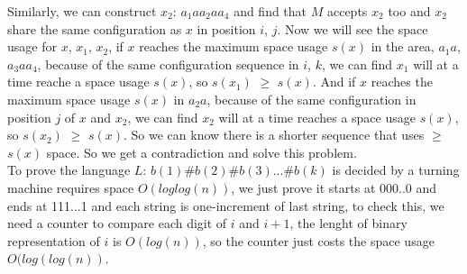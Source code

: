\documentclass[11pt]{article}
\begin{document}
Similarly, we can construct $x_{2}$: $a_{1}aa_{2}aa_{4}$ and find that $M$ accepts $x_{2}$ too and $x_{2}$ share the same configuration as $x$ in position $i$, $j$. Now we will see the space usage for $x$, $x_{1}$, $x_{2}$, if $x$ reaches the maximum space usage $s(x)$ in the area, $a_{1}a$, $a_{3}aa_{4}$, 
because of the same configuration sequence in $i$, $k$, we can find $x_{1}$ will at a time reache a space usage $s(x)$, so $s(x_{1})$ $\geq$ $s(x)$. And if $x$ reaches the maximum space usage $s(x)$ in $a_{2}a$, because of the same configuration in position $j$ of $x$ and $x_{2}$, we can find $x_{2}$ will at a time reaches a space usage $s(x)$, so $s(x_{2})$ $\geq$ $s(x)$. So we can know there is a shorter sequence that uses $\geq$ $s(x)$ space. So we get a contradiction and solve this problem. \\
To prove the language $L$: $b(1)$\#$b(2)$\#$b(3)$...\#$b(k)$ is decided by a turning machine requires space $O(loglog(n))$, we just prove it starts at 000..0 and ends at 111...1 and each string is one-increment of last string, to check this, we need a counter to compare each digit of $i$ and $i + 1$, the lenght of binary representation of $i$ is $O(log(n))$, so the counter just costs the space usage $O(log(log(n))$. 
\end{document}
